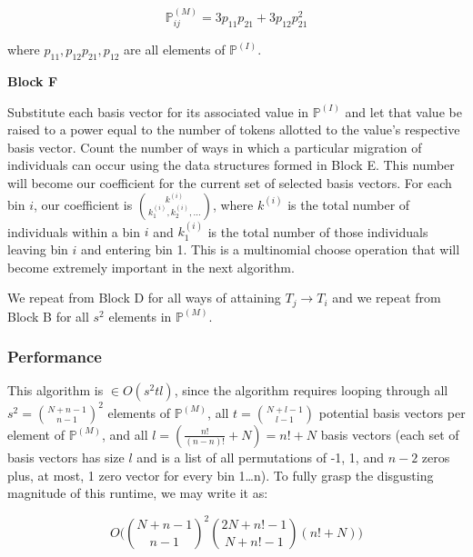 \documentclass{article}
\begin{document}
\[
\mathbb{P}^{(M)}_{ij} = 3p_{11}p_{21} + 3p_{12}p_{21}^2
\]

where $p_{11},p_{12}p_{21},p_{12}$ are all elements of $\mathbb{P}^{(I)}$.

\textbf{Block F}

Substitute each basis vector for its associated value in $\mathbb{P}^{(I)}$ and let that value be raised to a power equal to the number of tokens allotted to the value's respective basis vector. Count the number of ways in which a particular migration of individuals can occur using the data structures formed in Block E. This number will become our coefficient for the current set of selected basis vectors. For each bin $i$, our coefficient is ${k^{(i)} \choose k^{(i)}_1,k^{(i)}_2,...}$, where $k^{(i)}$ is the total number of individuals within a bin $i$ and $k^{(i)}_1$ is the total number of those individuals leaving bin $i$ and entering bin 1. This is a multinomial choose operation that will become extremely important in the next algorithm.

We repeat from Block D for all ways of attaining $T_j \rightarrow T_i$ and we repeat from Block B for all $s^2$ elements in $\mathbb{P}^{(M)}$.

\subsubsection{Performance}
This algorithm is $\in  O(s^2tl)$, since the algorithm requires looping through all $s^2 = {N+n-1 \choose n-1}^2$ elements of $\mathbb{P}^{(M)}$, all $t = {N+l-1 \choose l-1}$ potential basis vectors per element of $\mathbb{P}^{(M)}$, and all $l = (\frac{n!}{(n-n)!}+N) = n! + N$ basis vectors (each set of basis vectors has size $l$ and is a list of all permutations of -1, 1, and $n-2$ zeros plus, at most, 1 zero vector for every bin 1\dots n). To fully grasp the disgusting magnitude of this runtime, we may write it as:

\[
O\bigg( {N+n-1 \choose n-1}^2 {2N+n!-1 \choose N+n!-1} (n! + N) \bigg)
\]

\end{document}
